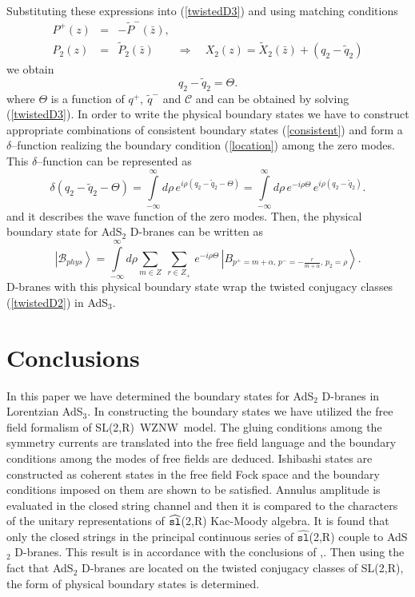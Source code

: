 \documentclass[a4paper,12pt]{article}
\begin{document}
Substituting these expressions into (\ref{twistedD3}) and using matching
conditions
\begin{eqnarray*}
P^{+}\left( z\right) &=&-\tilde{P}^{-}\left( \bar{z}\right) , \\
P_{2}\left( z\right) &=&\tilde{P}_{2}\left( \bar{z}\right) \qquad
\Rightarrow \quad X_{2}(z)=\tilde{X}_{2}(\bar{z})+\left( q_{2}-\tilde{q}%
_{2}\right)
\end{eqnarray*}
we obtain
\begin{equation}
q_{2}-\tilde{q}_{2}=\Theta .  \label{location}
\end{equation}
where $\Theta $ is a function of $q^{+},\ \tilde{q}^{-}$ and $\mathcal{C}$
and can be obtained by solving (\ref{twistedD3}). In order to write the
physical boundary states we have to construct appropriate combinations of
consistent boundary states (\ref{consistent}) and form a $\delta $--function
realizing the boundary condition (\ref{location}) among the zero modes. This
$\delta $--function can be represented as
\begin{equation}
\delta (q_{2}-\tilde{q}_{2}-\Theta )=\int\limits_{-\infty }^{\infty }d\rho
\,e^{i\rho (q_{2}-\tilde{q}_{2}-\Theta )}=\int\limits_{-\infty }^{\infty
}d\rho \,e^{-i\rho \Theta }\,e^{i\rho (q_{2}-\tilde{q}_{2})}.  \label{delta}
\end{equation}
and it describes the wave function of the zero modes. Then, the physical
boundary state for AdS$_{2}$ D-branes can be written as
\begin{equation}
\left| \mathcal{B}_{phys}\right\rangle =\int\limits_{-\infty }^{\infty
}d\rho \sum_{m\in Z}\ \sum_{r\in Z_{+}}\,e^{-i\rho \Theta }\,\left|
B_{p^{+}=m+\alpha ,\,p^{-}=-\frac{r}{m+\alpha },\,p_{2}=\rho }\right\rangle .
\label{physB}
\end{equation}
D-branes with this physical boundary state wrap the twisted conjugacy
classes (\ref{twistedD2}) in AdS$_{3}$.

\section{Conclusions}

In this paper we have determined the boundary states for AdS$_{2}$
D-branes in Lorentzian AdS$_{3}$. In constructing the boundary
states we have utilized the free field formalism of SL(2,R)\ WZNW\
model. The gluing conditions among the symmetry currents are
translated into the free field language and the boundary
conditions among the modes of free fields are deduced. Ishibashi
states are constructed as coherent states in the free field Fock
space and the boundary conditions imposed on them are shown to be
satisfied. Annulus amplitude is evaluated in the closed string
channel and then it is
compared to the characters of the unitary representations of $\widehat{%
\mathtt{sl}}$(2,R) Kac-Moody algebra. It is found that only the
closed strings in the principal continuous series of
$\widehat{\mathtt{sl}}$(2,R) couple to AdS$_{2}$ D-branes. This
result is in accordance with the conclusions of
\cite{bars1},\cite{BDM}. Then using the fact that AdS$_{2}$
D-branes are located on the twisted conjugacy classes of SL(2,R),
the form of physical boundary states is determined.
\end{document}
